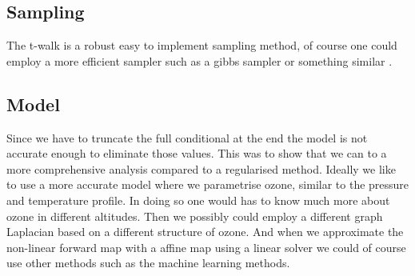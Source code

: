 \subsection{Sampling}
The t-walk is a robust easy to implement sampling method, of course one could employ a more efficient sampler such as a gibbs sampler or something similar \cite{}.

\subsection{Model}
Since we have to truncate the full conditional at the end the model is not accurate enough to eliminate those values.
This was to show that we can to a more comprehensive analysis compared to a regularised method.
Ideally we like to use a more accurate model where we parametrise ozone, similar to the pressure and temperature profile.
In doing so one would has to know much more about ozone in different altitudes.
Then we possibly could employ a different graph Laplacian based on a different structure of ozone.
And when we approximate the non-linear forward map with a affine map using a linear solver we could of course use other methods such as the machine learning methods.

